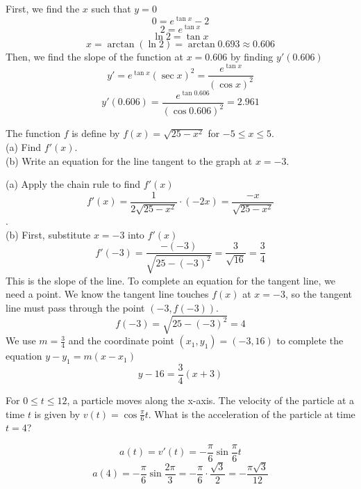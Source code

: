 \begin{Answer}
    [ref=deriv_rules8]
    First, we find the $x$ such that $y = 0$ 
    $$0 = e^{\tan{x}} - 2$$ 
    $$2 = e^{\tan{x}}$$ $$\ln{2} = \tan{x}$$ 
    $$x=\arctan{(\ln{2})} = \arctan{0.693} \approx 0.606$$
    Then, we find the slope of the function at $x=0.606$ by finding 
    $y'(0.606)$ 
    $$y'=e^{\tan{x}}(\sec{x})^2  = \frac{e^{\tan{x}}}{(\cos{x})^2}$$
    $$y'(0.606) = \frac{e^{\tan{0.606}}}{(\cos{0.606})^2} = 2.961$$
\end{Answer}

\begin{Exercise}
    [label=deriv_rules9]
    The function $f$ is define by $f(x) = \sqrt{25-x^2}$ for $-5 \leq 
    x \leq 5$. \\
    (a) Find $f'(x)$. \\
    (b) Write an equation for the line tangent to the graph at $x = -3$. 
\end{Exercise}
\begin{Answer}
    [ref=deriv_rules9]
    (a) Apply the chain rule to find $f'(x)$ 
    $$f'(x) = \frac{1}{2\sqrt{25 - x^2}} \cdot(-2x) = \frac{-x}{
    \sqrt{25-x^2}}$$. \\
    (b) First, substitute $x=-3$ into $f'(x)$ 
    $$f'(-3) = \frac{-(-3)}{\sqrt{25 - (-3)^2}} = \frac{3}{\sqrt{16}} 
    = \frac{3}{4}$$
    This is the slope of the line. To complete an equation for the 
    tangent line, we need a point. We know the tangent line touches 
    $f(x)$ at $x = -3$, so the tangent line must pass through the 
    point $(-3, f(-3))$. $$f(-3) = \sqrt{25-(-3)^2} = 4$$ We use $m = 
    \frac{3}{4}$ and the coordinate point $(x_1, y_1) = (-3, 16)$ to 
    complete the equation $y - y_1 = m(x - x_1)$ 
    $$y-16 = \frac{3}{4}(x+3)$$
\end{Answer}

\begin{Exercise}
    [label=deriv_rules10]
    For $0 \leq t \leq 12$, a particle moves along the x-axis. The 
    velocity of the particle at a time $t$ is given by $v(t) = 
    \cos{\frac{\pi}{6}t}$. What is the acceleration of the particle 
    at time $t = 4$?
\end{Exercise}
\begin{Answer}
    [ref=deriv_rules10]
    $$a(t) = v'(t) = -\frac{\pi}{6}\sin{\frac{\pi}{6}t}$$
    $$a(4) = -\frac{\pi}{6}\sin{\frac{2\pi}{3}} = 
    -\frac{\pi}{6}\cdot\frac{\sqrt{3}}{2}=-\frac{\pi \sqrt{3}}{12}$$
\end{Answer}

